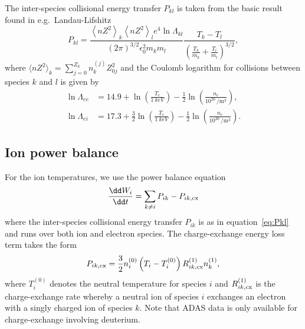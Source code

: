 \documentclass{notes}
\begin{document}
	The inter-species collisional energy transfer $P_{kl}$ is taken from the
	basic result found in e.g.\ Landau-Lifshitz
	\begin{equation}\label{eq:Pkl}
		P_{kl} = 
			\frac{
				\left\langle nZ^2 \right\rangle_k
				\left\langle nZ^2 \right\rangle_l
				e^4\ln\Lambda_{kl}
			}{
				\left(2\pi\right)^{3/2}\epsilon_0^2 m_k m_l
			}
			\frac{T_k - T_l}{
				\left(
					\frac{T_k}{m_k} + \frac{T_l}{m_l}
				\right)^{3/2}
			},
	\end{equation}
	where $\langle nZ^2 \rangle_k = \sum_{j=0}^{Z_k}n_k^{(j)}Z_{0j}^2$ and
	the Coulomb logarithm for collisions between species $k$ and $l$ is given
	by
	\begin{align}
		\ln\Lambda_{ee} &= 14.9 + \ln\left(\frac{T_e}{\SI{1}{keV}}\right)
			- \frac{1}{2}\ln\left(\frac{n_e}{10^{20}\,\si{\per\meter\cubed}}\right),\\
		\ln\Lambda_{ei} &= 17.3 + \frac{3}{2}\ln\left(\frac{T_e}{\SI{1}{keV}}\right)
			- \frac{1}{2}\ln\left(\frac{n_e}{10^{20}\,\si{\per\meter\cubed}}\right).
	\end{align}

	\subsection{Ion power balance}
	For the ion temperatures, we use the power balance equation
	\begin{equation}
		\frac{\dd W_i}{\dd t} =
			\sum_{k\neq i} P_{ik} - P_{ik,{\rm cx}}
	\end{equation}
	where the inter-species collisional energy transfer $P_{ik}$ is as in
	equation~\eqref{eq:Pkl} and runs over both ion and electron species. The
	charge-exchange energy loss term takes the form
	\begin{equation}\label{eq:cx}
		P_{ik,{\rm cx}} =
			\frac{3}{2}n_i^{(0)}\left(T_i - T_i^{(0)}\right)
			R_{ik,{\rm cx}}^{(1)}n_k^{(1)},
	\end{equation}
	where $T_i^{(0)}$ denotes the neutral temperature for species $i$ and
	$R_{ik,{\rm cx}}^{(1)}$ is the charge-exchange rate whereby a neutral ion of
	species $i$ exchanges an electron with a singly charged ion of species $k$.
	Note that ADAS data is only available for charge-exchange involving
	deuterium.
\end{document}

